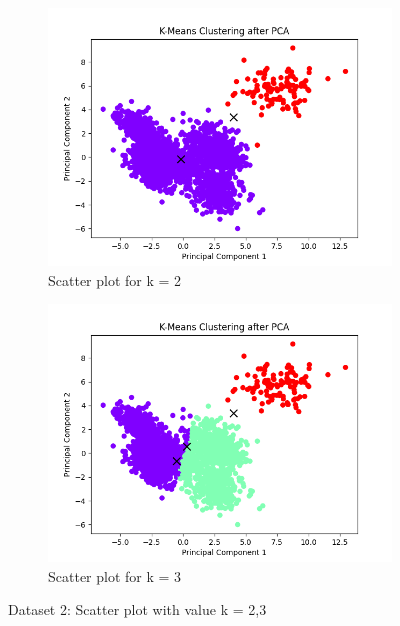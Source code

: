 \documentclass[12pt]{report}
\begin{document}
	\begin{figure}[H]
		\centering
		\begin{subfigure}{.5\textwidth}
			\centering
			\includegraphics[width=.9\linewidth]{../K-means/Output/Dataset2/scatterPlot_k=2.png}
			\caption{Scatter plot for k = 2}
			\label{Dataset2Scatterplotk2}
		\end{subfigure}%
		\begin{subfigure}{.5\textwidth}
			\centering
			\includegraphics[width=.9\linewidth]{../K-means/Output/Dataset2/scatterPlot_k=3.png}
			\caption{Scatter plot for k = 3}
			\label{Dataset2Scatterplotk3}
		\end{subfigure}
		\caption{Dataset 2: Scatter plot with value k = 2,3}
		\label{Dataset2Scatterplot23}
	\end{figure}
\end{document}
